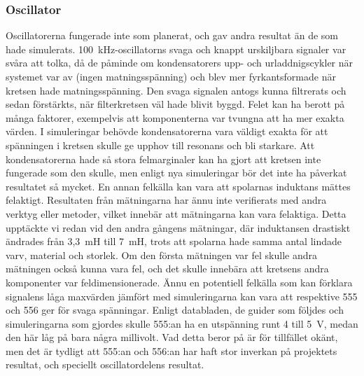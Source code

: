 \documentclass[a4paper]{article}
\makeatletter
\let\\\@raggedtwoe@savedcr%
\makeatother
\begin{document}
\begin{sloppypar}
    \subsubsection{Oscillator}
    Oscillatorerna fungerade inte som planerat, och gav andra resultat än de som hade simulerats.
    100~kHz-oscillatorns svaga och knappt urskiljbara signaler var svåra att tolka, då de påminde om kondensatorers upp- och urladdnigscykler när systemet var av (ingen matningsspänning) och blev mer fyrkantsformade när kretsen hade matningsspänning.
    Den svaga signalen antogs kunna filtrerats och sedan förstärkts, när filterkretsen väl hade blivit byggd.
    Felet kan ha berott på många faktorer, exempelvis att komponenterna var tvungna att ha mer exakta värden.
    I simuleringar behövde kondensatorerna vara väldigt exakta för att spänningen i kretsen skulle ge upphov till resonans och bli starkare.
    Att kondensatorerna hade så stora felmarginaler kan ha gjort att kretsen inte fungerade som den skulle, men enligt nya simuleringar bör det inte ha påverkat resultatet så mycket.
    \\\\
    En annan felkälla kan vara att spolarnas induktans mättes felaktigt. Resultaten från mätningarna har ännu inte verifierats med andra verktyg eller metoder, vilket innebär att mätningarna kan vara felaktiga.
    Detta upptäckte vi redan vid den andra gångens mätningar, där induktansen drastiskt ändrades från 3,3~mH till 7~mH, trots att spolarna hade samma antal lindade varv, material och storlek.
    Om den första mätningen var fel skulle andra mätningen också kunna vara fel, och det skulle innebära att kretsens andra komponenter var feldimensionerade.
    \\\\
    Ännu en potentiell felkälla som kan förklara signalens låga maxvärden jämfört med simuleringarna kan vara att respektive 555 och 556 ger för svaga spänningar. Enligt databladen, de guider som följdes och simuleringarna som gjordes skulle 555:an ha en utspänning runt 4 till 5~V, medan den här låg på bara några millivolt.
    Vad detta beror på är för tillfället okänt, men det är tydligt att 555:an och 556:an har haft stor inverkan på projektets resultat, och speciellt oscillatordelens resultat.

\end{sloppypar}
\end{document}
